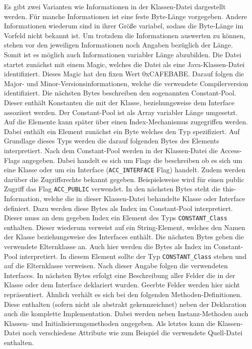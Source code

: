 \documentclass[conference]{IEEEtran}
\begin{document}
Es gibt zwei Varianten wie Informationen in der Klassen-Datei dargestellt werden. Für manche Informationen ist eine feste Byte-Länge vorgegeben. Andere Informationen wiederum sind in ihrer Größe variabel, sodass die Byte-Länge im Vorfeld nicht bekannt ist. Um trotzdem die Informationen auswerten zu können, stehen vor den jeweiligen Informationen noch Angaben bezüglich der Länge. Somit ist es möglich auch Informationen variabler Länge abzubilden.
Die Datei startet zunächst mit einem Magic, welches die Datei als eine Java-Klassen-Datei identifiziert. Dieses Magic hat den fixen Wert 0xCAFEBABE. Darauf folgen die Major- und Minor-Versionsinformationen, welche die verwendete Compilerversion identifiziert. Die nächsten Bytes beschreiben den sogenannten Constant-Pool. Dieser enthält Konstanten die mit der Klasse, beziehungsweise dem Interface assoziiert werden. Der Constant-Pool ist als Array variabler Länge umgesetzt. Auf die Elemente kann später über einen Index-Mechanismus zugegriffen werden. Dabei enthält ein Element zunächst ein Byte welches den Typ spezifiziert. Auf Grundlage dieses Typs werden die darauf folgenden Bytes des Elements interpretiert. Nach dem Constant-Pool werden in der Klassen-Datei die Access-Flags angegeben. Dabei handelt es sich um Flags die beschreiben ob es sich um eine Klasse oder um ein Interface (\verb|ACC_INTERFACE| Flag) handelt. Zudem werden darüber die Zugriffsrechte bekannt gegeben. Beispielsweise wird für einen public Zugriff das Flag \verb|ACC_PUBLIC| verwendet. In den nächsten Bytes steht die this-Information, welche die in dieser Klassen-Datei behandelte Klasse oder Interface definiert. Dazu werden diese Bytes als Index im Constant-Pool interpretiert. Dieser muss an dem gegeben Index ein Element des Typs \verb|CONSTANT_Class| enthalten. Dieser wiederum verweist auf ein String-Element, welches den Namen der Klasse beziehungsweise des Interfaces enthält. Die nächsten Bytes geben die verwendete Elternklasse an. Auch hier werden die Bytes als Index im Constant-Pool interpretiert. In diesem Element sollte der Typ \verb|CONSTANT_Class| stehen und auf die Elternklasse verweisen. Nach dieser Angabe folgen die verwendeten Interfaces. In nächsten Bytes erfolgt eine Beschreibung aller Felder die in der Klasse oder dem Interface deklariert wurden. Geerbte Felder werden hier nicht repräsentiert. Ähnlich verhält es sich bei den folgenden Methoden-Definitionen. Diese enthalten (sofern nicht als abstrakt gekennzeichnet) neben der Deklaration auch die komplette Implementation. Dabei werden neben Instanz-Methoden auch Klassen- und Initialisierungsmethoden angegeben. Als letztes kann die Klassen-Datei noch verschiedene Attribute wie zum Beispiel die verwendete Quell-Datei enthalten. \cite{Venners.1996b} \cite{Lindholm.21.08.2018}
\end{document}
